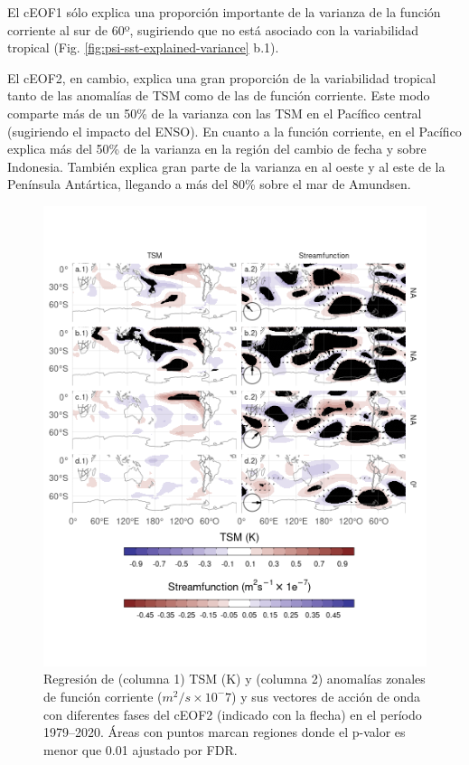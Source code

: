 \documentclass[12pt,oneside]{reedthesis}
\begin{document}
El cEOF1 sólo explica una proporción importante de la varianza de la función corriente al sur de 60º, sugiriendo que no está asociado con la variabilidad tropical (Fig. \ref{fig:psi-sst-explained-variance} b.1).

El cEOF2, en cambio, explica una gran proporción de la variabilidad tropical tanto de las anomalías de TSM como de las de función corriente.
Este modo comparte más de un 50\% de la varianza con las TSM en el Pacífico central (sugiriendo el impacto del ENSO).
En cuanto a la función corriente, en el Pacífico explica más del 50\% de la varianza en la región del cambio de fecha y sobre Indonesia.
También explica gran parte de la varianza en al oeste y al este de la Península Antártica, llegando a más del 80\% sobre el mar de Amundsen.



\begin{figure}
\includegraphics{figures/20-ceofs/sst-psi-2-1} \caption{Regresión de (columna 1) TSM (K) y (columna 2) anomalías zonales de función corriente (\(m^2/s\times10^-7\)) y sus vectores de acción de onda con diferentes fases del cEOF2 (indicado con la flecha) en el período 1979--2020. Áreas con puntos marcan regiones donde el p-valor es menor que 0.01 ajustado por FDR.}\label{fig:sst-psi-2}
\end{figure}
\end{document}
